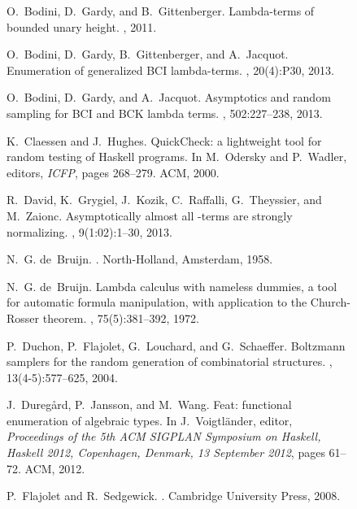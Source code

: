 \documentclass{sig-alternate}
\begin{document}
\begin{figure*}[!t]
\begin{thebibliography}{10}
O.~Bodini, D.~Gardy, and B.~Gittenberger.
\newblock Lambda-terms of bounded unary height.
, 2011.

O.~Bodini, D.~Gardy, B.~Gittenberger, and A.~Jacquot.
\newblock Enumeration of generalized {BCI} lambda-terms.
, 20(4):P30, 2013.

O.~Bodini, D.~Gardy, and A.~Jacquot.
\newblock Asymptotics and random sampling for {BCI} and {BCK} lambda terms.
, 502:227--238, 2013.

K.~Claessen and J.~Hughes.
\newblock \textsf{QuickCheck}: a lightweight tool for random testing of
  \textsf{Haskell} programs.
\newblock In M.~Odersky and P.~Wadler, editors, {\em ICFP}, pages 268--279.
  ACM, 2000.

R.~David, K.~Grygiel, J.~Kozik, C.~Raffalli, G.~Theyssier, and M.~Zaionc.
\newblock Asymptotically almost all -terms are strongly normalizing.
, 9(1:02):1--30, 2013.

N.~G. de~Bruijn.
.
\newblock North-Holland, Amsterdam, 1958.

N.~G. de~Bruijn.
\newblock Lambda calculus with nameless dummies, a tool for automatic formula
  manipulation, with application to the {Church-Rosser} theorem.
,
  75(5):381--392, 1972.

P.~Duchon, P.~Flajolet, G.~Louchard, and G.~Schaeffer.
\newblock Boltzmann samplers for the random generation of combinatorial
  structures.
, 13(4-5):577--625,
  2004.

J.~Dureg{\aa}rd, P.~Jansson, and M.~Wang.
\newblock Feat: functional enumeration of algebraic types.
\newblock In J.~Voigtl{\"a}nder, editor, {\em Proceedings of the 5th {ACM
  SIGPLAN} {Symposium on Haskell, Haskell} 2012, {Copenhagen, Denmark}, 13
  {September} 2012}, pages 61--72. ACM, 2012.

P.~Flajolet and R.~Sedgewick.
.
\newblock Cambridge University Press, 2008.


\end{thebibliography}
\end{figure*}
\end{document}
